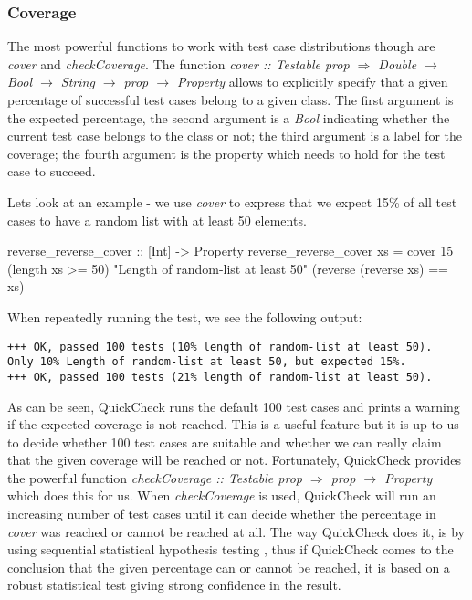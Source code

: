 \subsubsection*{Coverage}
The most powerful functions to work with test case distributions though are \textit{cover} and \textit{checkCoverage}. The function \textit{cover :: Testable prop $\Rightarrow$ Double $\rightarrow$ Bool $\rightarrow$ String $\rightarrow$ prop $\rightarrow$ Property} allows to explicitly specify that a given percentage of successful test cases belong to a given class. The first argument is the expected percentage, the second argument is a \textit{Bool} indicating whether the current test case belongs to the class or not; the third argument is a label for the coverage; the fourth argument is the property which needs to hold for the test case to succeed. 

Lets look at an example - we use \textit{cover} to express that we expect 15\% of all test cases to have a random list with at least 50 elements.

\begin{HaskellCode}
reverse_reverse_cover :: [Int] -> Property
reverse_reverse_cover xs  
  = cover 15 (length xs >= 50) "Length of random-list at least 50"
             (reverse (reverse xs) == xs)
\end{HaskellCode}

When repeatedly running the test, we see the following output:

\begin{verbatim}
+++ OK, passed 100 tests (10% length of random-list at least 50).
Only 10% Length of random-list at least 50, but expected 15%.
+++ OK, passed 100 tests (21% length of random-list at least 50).
\end{verbatim}

As can be seen, QuickCheck runs the default 100 test cases and prints a warning if the expected coverage is not reached. This is a useful feature but it is up to us to decide whether 100 test cases are suitable and whether we can really claim that the given coverage will be reached or not. Fortunately, QuickCheck provides the powerful function \textit{checkCoverage :: Testable prop $\Rightarrow$ prop $\rightarrow$ Property} which does this for us. When \textit{checkCoverage} is used, QuickCheck will run an increasing number of test cases until it can decide whether the percentage in \textit{cover} was reached or cannot be reached at all. The way QuickCheck does it, is by using sequential statistical hypothesis testing \cite{wald_sequential_1992}, thus if QuickCheck comes to the conclusion that the given percentage can or cannot be reached, it is based on a robust statistical test giving strong confidence in the result.

